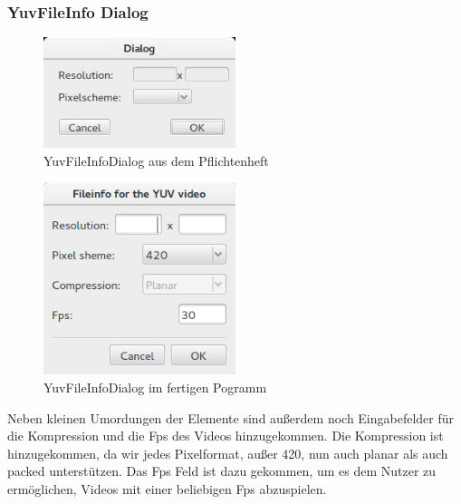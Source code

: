 \documentclass{scrartcl}
\begin{document}
{\subsubsection{YuvFileInfo Dialog}
\bigskip
\begin{figure}[ht]
\centering
\includegraphics[width=0.5\textwidth]{Pictures/fileinfoalt.jpg}
\caption{YuvFileInfoDialog aus dem Pflichtenheft}
\end{figure}
\begin{figure}[ht]
\centering
\includegraphics[width=0.5\textwidth]{Pictures/fileinfoneu.png}
\caption{YuvFileInfoDialog im fertigen Pogramm}
\end{figure}
Neben kleinen Umordungen der Elemente sind außerdem noch Eingabefelder für die Kompression und die Fps des Videos hinzugekommen. Die Kompression ist hinzugekommen, da wir jedes Pixelformat, außer 420, nun auch planar als auch packed unterstützen. Das Fps Feld ist dazu gekommen, um es dem Nutzer zu ermöglichen, Videos mit einer beliebigen Fps abzuspielen.
\newpage
}
\end{document}
